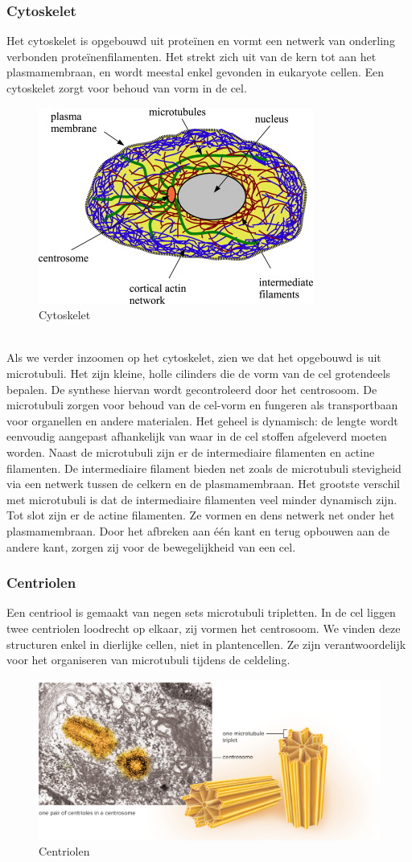 \documentclass[a4paper,kul]{kulakarticle} %
\begin{document}
\subsubsection{Cytoskelet}
Het cytoskelet is opgebouwd uit proteïnen en vormt een netwerk van onderling verbonden proteïnenfilamenten. Het strekt zich uit van de kern tot aan het plasmamembraan, en wordt meestal enkel gevonden in eukaryote cellen. Een cytoskelet zorgt voor behoud van vorm in de cel.
\begin{figure}[h]
	\centering
	\includegraphics[width=0.5\linewidth]{Cytoskelet}
	\caption[Cytoskelet]{Cytoskelet}
	\label{fig:cytoskelet}
\end{figure}\\
Als we verder inzoomen op het cytoskelet, zien we dat het opgebouwd is uit microtubuli. Het zijn kleine, holle cilinders die de vorm van de cel grotendeels bepalen. De synthese hiervan wordt gecontroleerd door het centrosoom. De microtubuli zorgen voor behoud van de cel-vorm en fungeren als transportbaan voor organellen en andere materialen. Het geheel is dynamisch: de lengte wordt eenvoudig aangepast afhankelijk van waar in de cel stoffen afgeleverd moeten worden. 
Naast de microtubuli zijn er de intermediaire filamenten en actine filamenten. De intermediaire filament bieden net zoals de microtubuli stevigheid via een netwerk tussen de celkern en de plasmamembraan. Het grootste verschil met microtubuli is dat de intermediaire filamenten veel minder dynamisch zijn.
Tot slot zijn er de actine filamenten. Ze vormen en dens netwerk net onder het plasmamembraan. Door het afbreken aan één kant en terug opbouwen aan de andere kant, zorgen zij voor de bewegelijkheid van een cel.

\subsubsection{Centriolen}
Een centriool is gemaakt van negen sets microtubuli tripletten. In de cel liggen twee centriolen loodrecht op elkaar, zij vormen het centrosoom. We vinden deze structuren enkel in dierlijke cellen, niet in plantencellen. Ze zijn verantwoordelijk voor het organiseren van microtubuli tijdens de celdeling. 
\begin{figure}[h]
	\centering
	\includegraphics[width=0.5\linewidth]{Centriolen}
	\caption[Centriolen]{Centriolen}
	\label{fig:centriolen}
\end{figure}
\newpage
\end{document}
